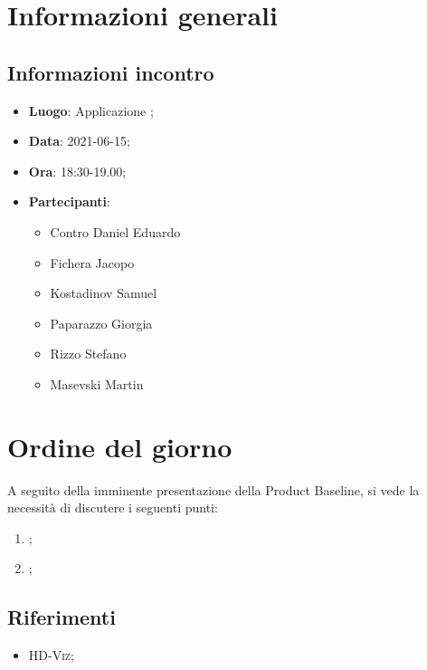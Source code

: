 \documentclass{article}
\begin{document}


\section{Informazioni generali}
\label{sec:info_generali}

\subsection{Informazioni incontro}
\label{sub:info_incontro}

\begin{itemize}
	\item \textbf{Luogo}: Applicazione ;
	\item \textbf{Data}: 2021-06-15;
	\item \textbf{Ora}: 18:30-19.00;
	\item \textbf{Partecipanti}:
	\begin{itemize}
		\item Contro Daniel Eduardo
		\item Fichera Jacopo
		\item Kostadinov Samuel
		\item Paparazzo Giorgia
		\item Rizzo Stefano
		\item Masevski Martin
	\end{itemize}
\end{itemize}

\section{Ordine del giorno}%
\label{sec:ordine_del_giorno}
A seguito della imminente presentazione della Product Baseline, si vede la necessità di discutere i seguenti punti:
\begin{enumerate}
	\item {};
	\item {};
\end{enumerate}


\subsection{Riferimenti}%
\label{sub:riferimenti}
\begin{itemize}
    \item \textsc{HD-Viz};
    \end{itemize}
\end{document}
